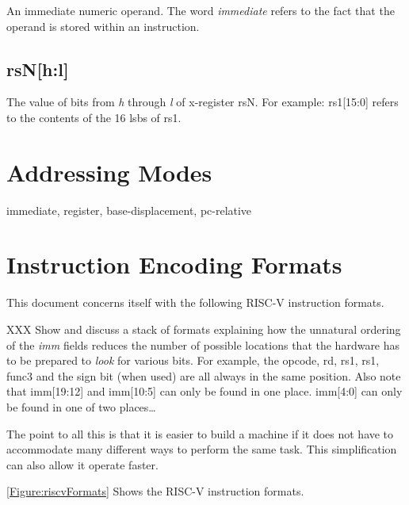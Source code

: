 An immediate numeric operand.  The word {\em immediate} refers
to the fact that the operand is stored within an instruction.

\subsection{rsN[h:l]}

The value of bits from {\em h} through {\em l} of x-register rsN.
For example: rs1[15:0] refers to the contents of 
the 16 \acrshort{lsb}s of rs1.


\section{Addressing Modes}

immediate, register, base-displacement, pc-relative


\section{Instruction Encoding Formats}
\label{section:EncodingFormats}

This 
document concerns itself with the following RISC-V instruction formats.

XXX Show and discuss a stack of formats explaining how the unnatural ordering
of the {\em imm} fields reduces the number of possible locations that 
the hardware has to be prepared to {\em look} for various bits.  For example,
the opcode, rd, rs1, rs1, func3 and the sign bit (when used) are all always 
in the same position.  Also note that imm[19:12] and imm[10:5] can only be 
found in one place.  imm[4:0] can only be found in one of two places\ldots

The point to all this is that it is easier to build a machine if it 
does not have to accommodate many different ways to perform the same task.
This simplification can also allow it operate faster.

\autoref{Figure:riscvFormats} Shows the RISC-V instruction formats.


